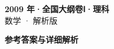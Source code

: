 \documentclass[zihao=-4, a4paper]{ctexart}
\begin{document}
\begin{center}
  {\Large\bfseries 2009 年·全国大纲卷Ⅰ·理科}\\[4pt]
  {\large 数学 · 解析版}
\end{center}
\medskip
{}

\clearpage
{}
\begin{center}{\Large\bfseries 参考答案与详细解析}\end{center}
\medskip

\end{document}
